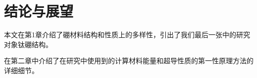 \documentclass[phd,nobackinfo]{scutthesis}
\begin{document}
\listoffigures

\listoftables

\mainmatter


%

%

%




\chapter{结论与展望}\label{chapter_concludes}

本文在第1章介绍了硼材料结构和性质上的多样性，引出了我们最后一张中的研究对象钛硼结构。

在第二章中介绍了在研究中使用到的计算材料能量和超导性质的第一性原理方法的详细细节。
\end{document}
